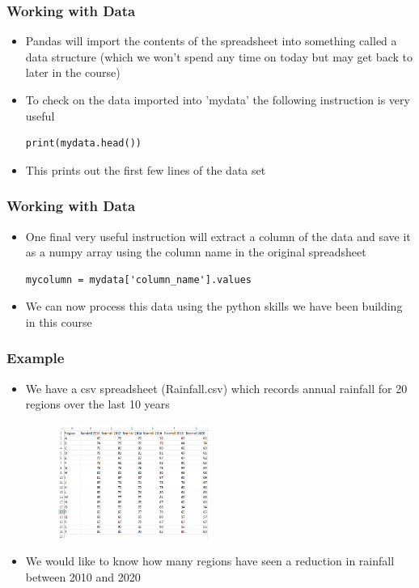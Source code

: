 \documentclass[english,14pt]{beamer}
\begin{document}
\begin{frame}[fragile]
\frametitle{Working with Data}
\begin{itemize}
    \item Pandas will import the contents of the spreadsheet into something called a data structure (which we won't spend any time on today but may get back to later in the course)
    \item To check on the data imported into 'mydata' the following instruction is very useful
\begin{lstlisting}[style=CStyle]
print(mydata.head())
\end{lstlisting}
    \item This prints out the first few lines of the data set
\end{itemize}
\end{frame}


\begin{frame}[fragile]
\frametitle{Working with Data}
\begin{itemize}
    \item One final very useful instruction will extract a column of the data and save it as a numpy array using the column name in the original spreadsheet
\begin{lstlisting}[style=CStyle]
mycolumn = mydata['column_name'].values   
\end{lstlisting}
    \item We can now process this data using the python skills we have been building in this course 
\end{itemize}
\end{frame}


\begin{frame}[fragile]
\frametitle{Example}
\begin{itemize}
    \item We have a csv spreadsheet (Rainfall.csv) which records annual rainfall for 20 regions over the last 10 years
    \begin{figure} 
        \centering
        \includegraphics[width=5cm]{figures/excel_rainfall.PNG}
        \label{fig:my_label}
    \end{figure}
    \item We would like to know how many regions have seen a reduction in rainfall between 2010 and 2020
\end{itemize}
\end{frame}
\end{document}
